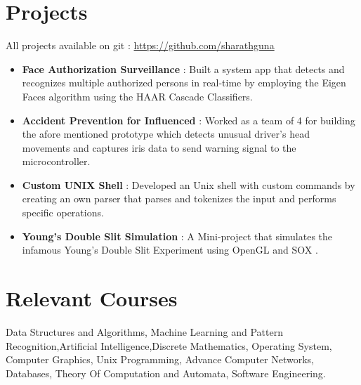 \documentclass[margin, centered]{res}
\begin{document}
\begin{resume}
\section{Projects}
All projects available on git : \url{https://github.com/sharathguna}
\begin{itemize}[leftmargin=*]
 \item \textbf{{Face Authorization Surveillance }} : Built a system app that detects and recognizes
multiple authorized persons in real-time by employing the Eigen Faces algorithm using the HAAR Cascade Classifiers.

\item \textbf{{Accident Prevention for Influenced }}: Worked as a team of 4 for building the afore mentioned
prototype which detects unusual driver's head movements and captures iris data to send warning signal to the microcontroller.

\item \textbf{{Custom UNIX Shell}} : Developed an Unix shell with custom commands by creating an own parser that parses and tokenizes the input and performs specific operations.

\item \textbf{{Young's Double Slit Simulation }}: A Mini-project that simulates the infamous Young's Double Slit Experiment using OpenGL and SOX .

\end{itemize}


\section{Relevant \hspace{2mm} Courses}
Data Structures and Algorithms, Machine Learning and Pattern Recognition,Artificial Intelligence,Discrete Mathematics, Operating System, Computer Graphics, Unix Programming, Advance Computer Networks, Databases, Theory Of Computation and Automata, Software Engineering.


\end{resume}
\end{document}
